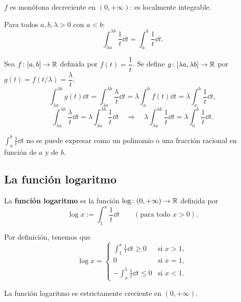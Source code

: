\documentclass[11pt,a4paper]{article}
\begin{document}
\begin{observacion}
$f$ es monótona decreciente en $(0,+\infty)$: es localmente integrable.
\end{observacion}

\begin{proposicion}
Para todos $a,b,\lambda>0$ con $a<b$:
\[
  \int_{\lambda a}^{\lambda b}\frac{1}{t}\dd t=\int_a^b\frac{1}{t}\dd t.
\]
\end{proposicion}

\begin{demo}
Sea $f\colon[a,b]\to\mathbb{R}$ definida por $f(t)=\dfrac1t$. Se define $g\colon[\lambda a,\lambda b]\to\mathbb{R}$ por $g(t)=f(t/\lambda)=\dfrac{\lambda}{t}$.
\[
  \int_{\lambda a}^{\lambda b}g(t)\dd t=\int_{\lambda a}^{\lambda b}\frac{\lambda}{t}\dd t
  =\lambda\int_a^b f(t)\dd t=\lambda\int_a^b\frac1t\dd t,
\]
\[
  \int_{\lambda a}^{\lambda b}\frac{\lambda}{t}\dd t=\lambda\int_{\lambda a}^{\lambda b}\frac1t\dd t
  \quad\Rightarrow\quad
  \lambda\int_{\lambda a}^{\lambda b}\frac1t\dd t=\lambda\int_a^b\frac1t\dd t.
\]
\end{demo}

\begin{observacion}
$\displaystyle\int_a^b\frac1t\dd t$ no se puede expresar como un polinomio o una fracción racional en función de $a$ y de $b$.
\end{observacion}

\subsection{La función logaritmo}

\begin{definicion}
La \textbf{función logaritmo} es la función $\log\colon(0,+\infty)\to\mathbb{R}$ definida por
\[
  \log x:=\int_1^x\frac1t\dd t\qquad(\text{para todo } x>0).
\]
\end{definicion}

\begin{observacion}
Por definición, tenemos que
\[
  \log x=\begin{cases}
    \displaystyle\int_1^x\frac1t\dd t\ge0 & \text{si } x>1,\\[8pt]
    0 & \text{si } x=1,\\[4pt]
    -\displaystyle\int_x^1\frac1t\dd t\le0 & \text{si } x<1.
  \end{cases}
\]
\end{observacion}

\begin{proposicion}
La función logaritmo es estrictamente creciente en $(0,+\infty)$.
\end{proposicion}
\end{document}
